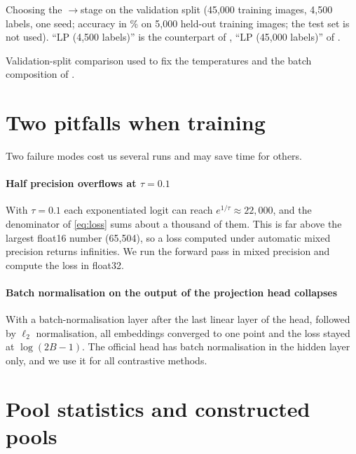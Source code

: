 \begin{table}[h]
\centering
\small
\caption{Choosing the \simclr{}$\to$\supcon stage on the validation split (45,000 training images, 4,500 labels, one
seed; accuracy in \% on 5,000 held-out training images; the test set is not used). ``LP (4,500 labels)'' is the
counterpart of \lpfive, ``LP (45,000 labels)'' of \lpall.}
\label{tab:valstage}

\end{table}

\begin{table}[h]
\centering
\small
\caption{Validation-split comparison used to fix the temperatures and the batch composition of \union.}
\label{tab:pilot}
\begin{adjustbox}{max width=\linewidth}

\end{adjustbox}
\end{table}

\section{Two pitfalls when training \supcon}
\label{app:pitfalls}
Two failure modes cost us several runs and may save time for others.

\paragraph{Half precision overflows at $\tau=0.1$}
With $\tau=0.1$ each exponentiated logit can reach $e^{1/\tau}\approx 22{,}000$, and the denominator of
\cref{eq:loss} sums about a thousand of them. This is far above the largest float16 number (65,504), so a
loss computed under automatic mixed precision returns infinities. We run the forward pass in mixed
precision and compute the loss in float32.

\paragraph{Batch normalisation on the output of the projection head collapses \supcon}
With a batch-normalisation layer after the last linear layer of the head, followed by $\ell_2$
normalisation, all embeddings converged to one point and the loss stayed at $\log(2B-1)$. The official
\supcon head has batch normalisation in the hidden layer only, and we use it for all contrastive methods.

\section{Pool statistics and constructed pools}
\label{app:pools}

